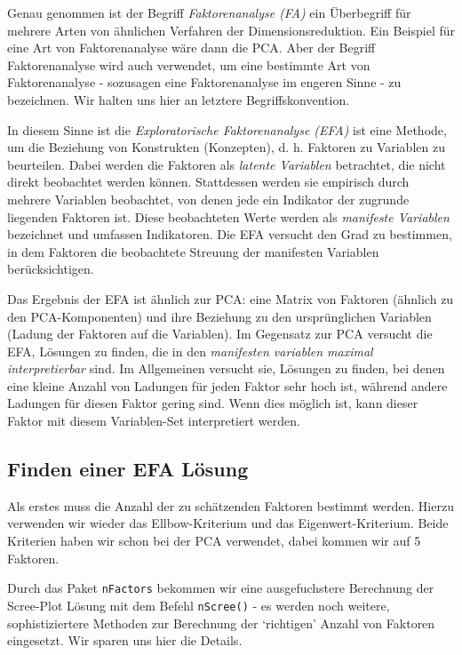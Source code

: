 \documentclass[12pt,ngerman,]{book}
\theoremstyle{definition}
\theoremstyle{definition}
\theoremstyle{remark}
\begin{document}
Genau genommen ist der Begriff \emph{Faktorenanalyse
(FA)} ein Überbegriff für mehrere Arten von
ähnlichen Verfahren der Dimensionsreduktion. Ein Beispiel für eine Art
von Faktorenanalyse wäre dann die PCA. Aber der Begriff Faktorenanalyse
wird auch verwendet, um eine bestimmte Art von Faktorenanalyse -
sozusagen eine Faktorenanalyse im engeren Sinne - zu bezeichnen. Wir
halten uns hier an letztere Begriffskonvention.

In diesem Sinne ist die \emph{Exploratorische Faktorenanalyse
(EFA)} ist eine Methode, um die
Beziehung von Konstrukten (Konzepten), d. h. Faktoren zu Variablen zu
beurteilen. Dabei werden die Faktoren als \emph{latente Variablen}
betrachtet, die nicht direkt beobachtet werden können. Stattdessen
werden sie empirisch durch mehrere Variablen beobachtet, von denen jede
ein Indikator der zugrunde liegenden Faktoren ist. Diese beobachteten
Werte werden als \emph{manifeste Variablen} bezeichnet und umfassen
Indikatoren. Die EFA versucht den Grad zu bestimmen, in dem Faktoren die
beobachtete Streuung der manifesten Variablen berücksichtigen.

Das Ergebnis der EFA ist ähnlich zur PCA: eine Matrix von Faktoren
(ähnlich zu den PCA-Komponenten) und ihre Beziehung zu den
ursprünglichen Variablen (Ladung der Faktoren auf die Variablen). Im
Gegensatz zur PCA versucht die EFA, Lösungen zu finden, die in den
\emph{manifesten variablen maximal interpretierbar} sind. Im Allgemeinen
versucht sie, Lösungen zu finden, bei denen eine kleine Anzahl von
Ladungen für jeden Faktor sehr hoch ist, während andere Ladungen für
diesen Faktor gering sind. Wenn dies möglich ist, kann dieser Faktor mit
diesem Variablen-Set interpretiert werden.

\subsection{Finden einer EFA Lösung}\label{finden-einer-efa-losung}

Als erstes muss die Anzahl der zu schätzenden Faktoren bestimmt werden.
Hierzu verwenden wir wieder das Ellbow-Kriterium und das
Eigenwert-Kriterium. Beide Kriterien haben wir schon bei der PCA
verwendet, dabei kommen wir auf 5 Faktoren.

Durch das Paket \texttt{nFactors} bekommen wir eine ausgefuchstere
Berechnung der Scree-Plot Lösung mit dem Befehl \texttt{nScree()} - es
werden noch weitere, sophistiziertere Methoden zur Berechnung der
`richtigen' Anzahl von Faktoren eingesetzt. Wir sparen uns hier die
Details.
\end{document}
